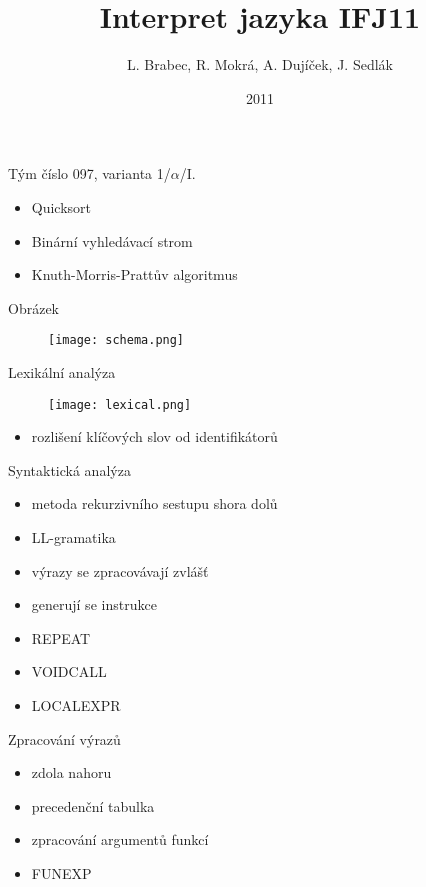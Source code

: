 \documentclass{beamer}
\title[Interpret jazyka IFJ11]{Interpret jazyka IFJ11}
\institute{FIT VUT Brno}
\author{~~L. Brabec, R. Mokrá, A. Dujíček, J. Sedlák~~\\}
\date{2011}
\begin{document}
\begin{frame}
  \maketitle
\end{frame}

\begin{frame}
  Tým číslo 097, varianta 1/$\alpha$/I.
  \begin{itemize}
  \item Quicksort
  \item Binární vyhledávací strom
  \item Knuth-Morris-Prattův algoritmus
  \end{itemize}
\end{frame}

\begin{frame}{Obrázek}
  \begin{figure}
    \texttt{[image: schema.png]}
  \end{figure}
\end{frame}

\begin{frame}{Lexikální analýza}
  \begin{figure}
    \texttt{[image: lexical.png]}
  \end{figure}
  \begin{itemize}
  \item rozlišení klíčových slov od identifikátorů
  \end{itemize}
\end{frame}

\begin{frame}{Syntaktická analýza}
  \begin{itemize}
  \item metoda rekurzivního sestupu shora dolů
  \item LL-gramatika
  \item výrazy se zpracovávají zvlášť
  \item generují se instrukce
  \item REPEAT
  \item VOIDCALL
  \item LOCALEXPR
  \end{itemize}
\end{frame}

\begin{frame}{Zpracování výrazů}
  \begin{itemize}
  \item zdola nahoru
  \item precedenční tabulka
  \item zpracování argumentů funkcí
  \item FUNEXP
  \end{itemize}
\end{frame}
\end{document}
